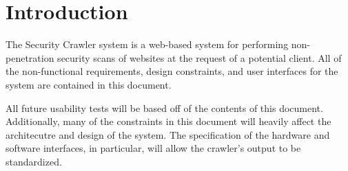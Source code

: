 \section{Introduction}
	The Security Crawler system is a web-based system for performing non-penetration security scans of websites at the request of a potential client.  All of the non-functional requirements, design constraints, and user interfaces for the system are contained in this document.

All future usability tests will be based off of the contents of this document.  Additionally, many of the constraints in this document will heavily affect the architecutre and design of the system.  The specification of the hardware and software interfaces, in particular, will allow the crawler's output to be standardized.

